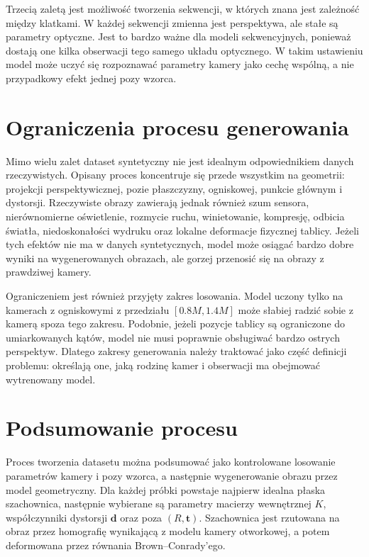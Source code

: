 \documentclass[12pt,a4paper]{report}
\begin{document}
Trzecią zaletą jest możliwość tworzenia sekwencji, w których znana jest zależność między
klatkami. W każdej sekwencji zmienna jest perspektywa, ale stałe są parametry optyczne.
Jest to bardzo ważne dla modeli sekwencyjnych, ponieważ dostają one kilka obserwacji tego
samego układu optycznego. W takim ustawieniu model może uczyć się rozpoznawać parametry
kamery jako cechę wspólną, a nie przypadkowy efekt jednej pozy wzorca.

\section{Ograniczenia procesu generowania}
Mimo wielu zalet dataset syntetyczny nie jest idealnym odpowiednikiem danych rzeczywistych.
Opisany proces koncentruje się przede wszystkim na geometrii: projekcji perspektywicznej,
pozie płaszczyzny, ogniskowej, punkcie głównym i dystorsji. Rzeczywiste obrazy zawierają jednak
również szum sensora, nierównomierne oświetlenie, rozmycie ruchu, winietowanie, kompresję,
odbicia światła, niedoskonałości wydruku oraz lokalne deformacje fizycznej tablicy.
Jeżeli tych efektów nie ma w danych syntetycznych, model może osiągać bardzo dobre wyniki
na wygenerowanych obrazach, ale gorzej przenosić się na obrazy z prawdziwej kamery.

Ograniczeniem jest również przyjęty zakres losowania. Model uczony tylko na kamerach z
ogniskowymi z przedziału $[0.8M,1.4M]$ może słabiej radzić sobie z kamerą spoza tego zakresu.
Podobnie, jeżeli pozycje tablicy są ograniczone do umiarkowanych kątów, model nie musi poprawnie
obsługiwać bardzo ostrych perspektyw. Dlatego zakresy generowania należy traktować jako część
definicji problemu: określają one, jaką rodzinę kamer i obserwacji ma obejmować wytrenowany
model.

\section{Podsumowanie procesu}
Proces tworzenia datasetu można podsumować jako kontrolowane losowanie parametrów kamery
i pozy wzorca, a następnie wygenerowanie obrazu przez model geometryczny. Dla każdej próbki
powstaje najpierw idealna płaska szachownica, następnie wybierane są parametry macierzy
wewnętrznej $K$, współczynniki dystorsji $\mathbf{d}$ oraz poza $(R,\mathbf{t})$.
Szachownica jest rzutowana na obraz przez homografię wynikającą z modelu kamery otworkowej,
a potem deformowana przez równania Brown--Conrady'ego.
\end{document}

